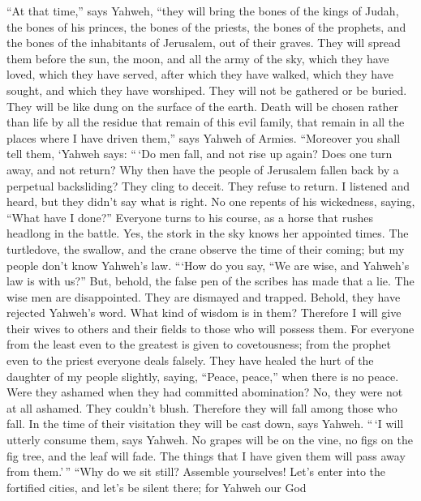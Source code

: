  ``At that time,'' says Yahweh, ``they will bring the bones
of the kings of Judah, the bones of his princes, the bones of the
priests, the bones of the prophets, and the bones of the inhabitants of
Jerusalem, out of their graves.  They will spread them
before the sun, the moon, and all the army of the sky, which they have
loved, which they have served, after which they have walked, which they
have sought, and which they have worshiped. They will not be gathered or
be buried. They will be like dung on the surface of the earth.
 Death will be chosen rather than life by all the residue
that remain of this evil family, that remain in all the places where I
have driven them,'' says Yahweh of Armies.  ``Moreover you
shall tell them, `Yahweh says: ``\,`Do men fall, and not rise up again?
Does one turn away, and not return?  Why then have the
people of Jerusalem fallen back by a perpetual backsliding? They cling
to deceit. They refuse to return.  I listened and heard, but
they didn't say what is right. No one repents of his wickedness, saying,
``What have I done?'' Everyone turns to his course, as a horse that
rushes headlong in the battle.  Yes, the stork in the sky
knows her appointed times. The turtledove, the swallow, and the crane
observe the time of their coming; but my people don't know Yahweh's law.
 ```How do you say, ``We are wise, and Yahweh's law is with
us?'' But, behold, the false pen of the scribes has made that a lie.
 The wise men are disappointed. They are dismayed and
trapped. Behold, they have rejected Yahweh's word. What kind of wisdom
is in them?  Therefore I will give their wives to others
and their fields to those who will possess them. For everyone from the
least even to the greatest is given to covetousness; from the prophet
even to the priest everyone deals falsely.  They have
healed the hurt of the daughter of my people slightly, saying, ``Peace,
peace,'' when there is no peace.  Were they ashamed when
they had committed abomination? No, they were not at all ashamed. They
couldn't blush. Therefore they will fall among those who fall. In the
time of their visitation they will be cast down, says Yahweh.
 ``\,`I will utterly consume them, says Yahweh. No grapes
will be on the vine, no figs on the fig tree, and the leaf will fade.
The things that I have given them will pass away from them.'\,''
 ``Why do we sit still? Assemble yourselves! Let's enter
into the fortified cities, and let's be silent there; for Yahweh our God
